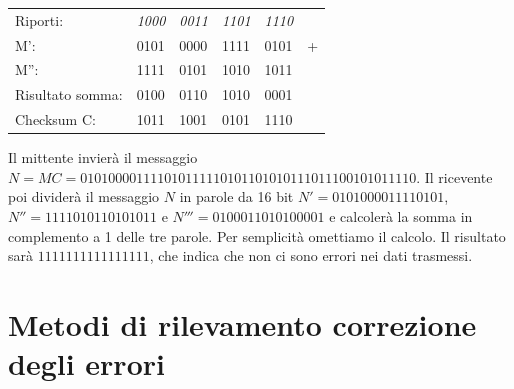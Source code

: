 \documentclass[12pt]{report}
\begin{document}
	\begin{center}		
		\begin{tabular}{llllll}
		Riporti:         & \textit{1000} & \textit{0011} & \textit{1101} & \textit{1110} &   \\
		M':              & 0101          & 0000          & 1111          & 0101          & + \\
		M'':             & 1111          & 0101          & 1010          & 1011          &   \\
		\hline
		Risultato somma: & 0100          & 0110          & 1010          & 0001          &   \\
		Checksum C:        & 1011          & 1001          & 0101          & 1110          &  
		\end{tabular}
	\end{center}
	Il mittente invierà il messaggio $N = MC = 0101 0000 1111 0101 1111 0101 1010 1011 1011 1001 0101 1110$. Il ricevente poi dividerà il messaggio $N$ in parole da 16 bit $N' = 0101 0000 1111 0101$, $N'' = 1111 0101 1010 1011$ e $N''' = 0100 0110 1010 0001$ e calcolerà la somma in complemento a 1 delle tre parole. Per semplicità omettiamo il calcolo. Il risultato sarà $1111 1111 1111 1111$, che indica che non ci sono errori nei dati trasmessi.
	
	\section{Metodi di rilevamento correzione degli errori}
\end{document}
